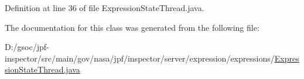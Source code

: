 Definition at line 36 of file Expression\+State\+Thread.\+java.



The documentation for this class was generated from the following file\+:\begin{DoxyCompactItemize}
\item 
D\+:/gsoc/jpf-\/inspector/src/main/gov/nasa/jpf/inspector/server/expression/expressions/\hyperlink{_expression_state_thread_8java}{Expression\+State\+Thread.\+java}\end{DoxyCompactItemize}
